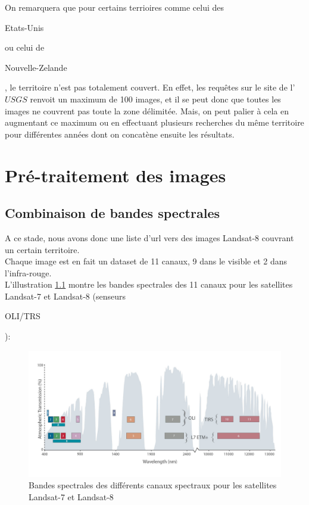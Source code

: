 \documentclass{book}
\begin{document}
\clearpage

On remarquera que pour certains terrioires comme celui des \begin{itshape}Etats-Unis\end{itshape} ou celui de \begin{itshape}Nouvelle-Zelande\end{itshape}, 
le territoire n'est pas totalement couvert. En effet, les requ\^{e}tes sur le site de l'$USGS$ renvoit un maximum 
de 100 images, et il se peut donc que toutes les images ne couvrent pas toute la zone délimitée. 
Mais, on peut palier à cela en augmentant ce maximum 
ou en effectuant plusieurs recherches du même territoire pour différentes années dont on concatène ensuite les résultats.\\

\chapter{Pré-traitement des images}
\section{Combinaison de bandes spectrales}

A ce stade, nous avons donc une liste d'url vers des images Landsat-8 couvrant un certain territoire.\\
Chaque image est en fait un dataset de 11 canaux, 9 dans le visible et 2 dans l'infra-rouge.\\
L'illustration \ref{lc8_bands} montre les bandes spectrales des 11 canaux pour les satellites 
Landsat-7 et Landsat-8 (senseurs \begin{itshape}OLI/TRS\end{itshape}):
\begin{figure}[H]
\begin{center}
\includegraphics[scale=0.2]{images/landsat8_bands.jpg}
\end{center}
\caption{Bandes spectrales des différents canaux spectraux pour les satellites Landsat-7 et Landsat-8 \cite{landsat8}}
\label{lc8_bands}
\end{figure}
\end{document}
